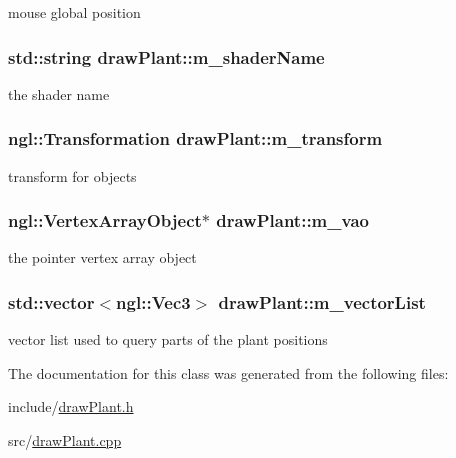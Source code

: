 mouse global position \hypertarget{classdrawPlant_ae7c41f7bf312aed18ccee672ed927a2a}{
\subsubsection[{m\_\-shaderName}]{\setlength{\rightskip}{0pt plus 5cm}std::string {\bf drawPlant::m\_\-shaderName}}}
\label{classdrawPlant_ae7c41f7bf312aed18ccee672ed927a2a}


the shader name \hypertarget{classdrawPlant_af4fb974b7d22e9e689ca056fb463cbd2}{
\subsubsection[{m\_\-transform}]{\setlength{\rightskip}{0pt plus 5cm}ngl::Transformation {\bf drawPlant::m\_\-transform}}}
\label{classdrawPlant_af4fb974b7d22e9e689ca056fb463cbd2}


transform for objects \hypertarget{classdrawPlant_a11498c9df9fbd17b2a1cb55942aff57b}{
\subsubsection[{m\_\-vao}]{\setlength{\rightskip}{0pt plus 5cm}ngl::VertexArrayObject$\ast$ {\bf drawPlant::m\_\-vao}}}
\label{classdrawPlant_a11498c9df9fbd17b2a1cb55942aff57b}


the pointer vertex array object \hypertarget{classdrawPlant_af985e9e9a97e3bb279767dfb9df62b2e}{
\subsubsection[{m\_\-vectorList}]{\setlength{\rightskip}{0pt plus 5cm}std::vector$<$ngl::Vec3$>$ {\bf drawPlant::m\_\-vectorList}}}
\label{classdrawPlant_af985e9e9a97e3bb279767dfb9df62b2e}


vector list used to query parts of the plant positions 

The documentation for this class was generated from the following files:\begin{DoxyCompactItemize}
\item 
include/\hyperlink{drawPlant_8h}{drawPlant.h}\item 
src/\hyperlink{drawPlant_8cpp}{drawPlant.cpp}\end{DoxyCompactItemize}
